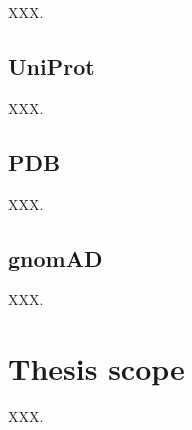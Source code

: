XXX.

\subsection{UniProt}

XXX.

\subsection{PDB}

XXX.

\subsection{gnomAD}

XXX.

\section{Thesis scope}

XXX.


